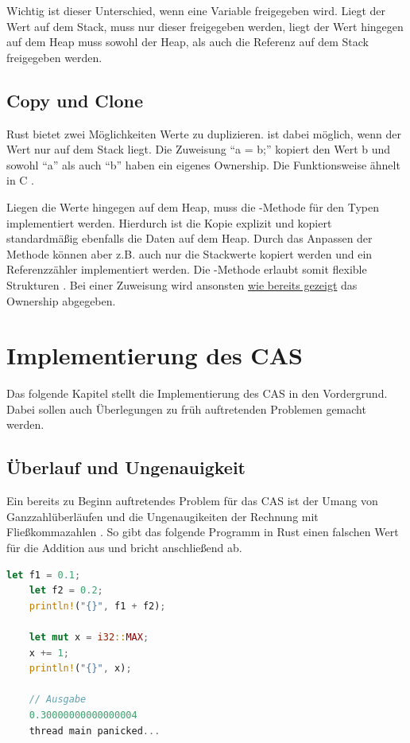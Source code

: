 \documentclass[11pt,a4paper, ngerman]{article}
\begin{document}
Wichtig ist dieser Unterschied, wenn eine Variable freigegeben wird. Liegt der Wert auf dem Stack, muss nur dieser freigegeben werden, liegt der Wert hingegen auf dem Heap muss sowohl der Heap, als auch die Referenz auf dem Stack freigegeben werden.

\subsection{Copy und Clone}
Rust bietet zwei Möglichkeiten Werte zu duplizieren.  ist dabei möglich, wenn der Wert nur auf dem Stack liegt. Die Zuweisung ``a = b;'' kopiert den Wert b und sowohl ``a'' als auch ``b'' haben ein eigenes Ownership. Die Funktionsweise ähnelt  in C \cite[S. 259 ff.]{SK19}.

Liegen die Werte hingegen auf dem Heap, muss die -Methode für den Typen implementiert werden. Hierdurch ist die Kopie explizit und kopiert standardmäßig ebenfalls die Daten auf dem Heap. Durch das Anpassen der Methode können aber z.B. auch nur die Stackwerte kopiert werden und ein Referenzzähler implementiert werden. Die -Methode erlaubt somit flexible Strukturen \cite[S. 260 ff.]{SK19}. Bei einer Zuweisung wird ansonsten \hyperref[sec:Ownership]{wie bereits gezeigt} das Ownership abgegeben.

\newpage

\section{Implementierung des CAS}
Das folgende Kapitel stellt die Implementierung des CAS in den Vordergrund. Dabei sollen auch Überlegungen zu früh auftretenden Problemen gemacht werden.

\subsection{Überlauf und Ungenauigkeit}
Ein bereits zu Beginn auftretendes Problem für das CAS ist der Umang von Ganzzahlüberläufen und die Ungenaugikeiten der Rechnung mit Fließkommazahlen \cite{IEEE754}. So gibt das folgende Programm in Rust einen falschen Wert für die Addition aus und bricht anschließend ab.

\begin{lstlisting}[language=rust, caption={Überlauf und Ungenauigkeit}]
    let f1 = 0.1;
    let f2 = 0.2;
    println!("{}", f1 + f2);

    let mut x = i32::MAX;
    x += 1;
    println!("{}", x);

    // Ausgabe
    0.30000000000000004
    thread main panicked...
\end{lstlisting}
\end{document}
